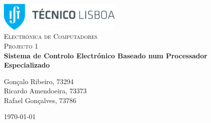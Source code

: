 \begin{titlepage}

\begin{center}

\includegraphics[width=6cm]{./title}\\[3cm]

\textsc{\LARGE Electrónica de Computadores}\\[1.5cm]

\textsc{\Large Projecto 1}\\[1.5cm]


{ \huge \bfseries Sistema de Controlo Electrónico Baseado num Processador Especializado \\[3cm] }


\noindent
\begin{center} \large
Gonçalo Ribeiro, 73294\\[5mm]

Ricardo Amendoeira, 73373\\[5mm]

Rafael Gonçalves, 73786\\

\end{center}

\vfill

{\large \today}


\end{center}

\end{titlepage}